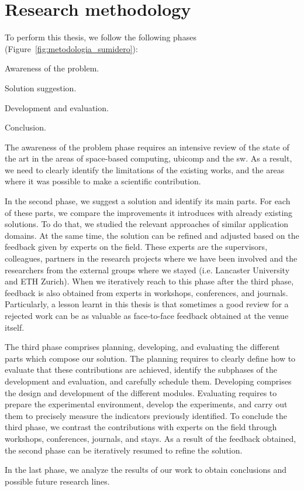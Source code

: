 \section{Research methodology}
To perform this thesis, we follow the following phases (Figure~\ref{fig:metodologia_sumidero}):
\begin{enumerate*}[label=\itshape\alph*\upshape)]
  \item Awareness of the problem.
  \item Solution suggestion.
  \item Development and evaluation.
  \item Conclusion.
\end{enumerate*}


The awareness of the problem phase requires an intensive review of the state of the art in the areas of
space-based computing, \acl{ubicomp} and the \acl{sw}.
As a result, we need to clearly identify the limitations of the existing works,
and the areas where it was possible to make a scientific contribution.


In the second phase, we suggest a solution and identify its main parts.
For each of these parts, we compare the improvements it introduces with already existing solutions.
To do that, we studied the relevant approaches of similar application domains.
At the same time, the solution can be refined and adjusted based on the feedback given by experts on the field.
These experts are the supervisors, colleagues, partners in the research projects where we have been involved and the researchers from the external groups where we stayed (i.e. Lancaster University and ETH Zurich). %
When we iteratively reach to this phase after the third phase, feedback is also obtained from experts in workshops, conferences, and journals.
Particularly, a lesson learnt in this thesis is that sometimes a good review for a rejected work can be as valuable as face-to-face feedback obtained at the venue itself. %


The third phase comprises planning, developing, and evaluating the different parts which compose our solution.
The planning requires to clearly define how to evaluate that these contributions are achieved, identify the subphases of the development and evaluation, and carefully schedule them.
Developing comprises the design and development of the different modules.
Evaluating requires to prepare the experimental environment, develop the experiments, and carry out them to precisely measure the indicators previously identified. %
To conclude the third phase, we contrast the contributions with experts on the field through workshops, conferences, journals, and stays.
As a result of the feedback obtained, the second phase can be iteratively resumed to refine the solution.


In the last phase, we analyze the results of our work to obtain conclusions and possible future research lines.

